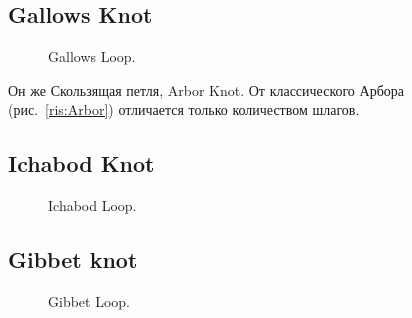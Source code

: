 \subsection{Gallows Knot}

\begin{figure}[H]\centering
	\begin{minipage}{1\linewidth}
		\begin{center}
			\tcbox[enhanced jigsaw,colframe=black,opacityframe=0.5,opacityback=0.5]
			{\centering{}}
		\end{center}
	\end{minipage}
\caption{Gallows Loop.}
\label{ris:Gallows_Knot}
\end{figure}

Он же Скользящая петля, Arbor Knot. От классического Арбора (рис.~\ref{ris:Arbor}) отличается только количеством шлагов.

\subsection{Ichabod Knot}

\begin{figure}[H]\centering
	\begin{minipage}{1\linewidth}
		\begin{center}
			\tcbox[enhanced jigsaw,colframe=black,opacityframe=0.5,opacityback=0.5]
			{\centering{}}
		\end{center}
	\end{minipage}
\caption{Ichabod Loop.}
\label{ris:Ichabod_Knot}
\end{figure}

\subsection{Gibbet knot}

\begin{figure}[H]\centering
	\begin{minipage}{1\linewidth}
		\begin{center}
			\tcbox[enhanced jigsaw,colframe=black,opacityframe=0.5,opacityback=0.5]
			{\centering{}}
		\end{center}
	\end{minipage}
\caption{Gibbet Loop.}
\label{ris:Gibbet_Knot}
\end{figure}

